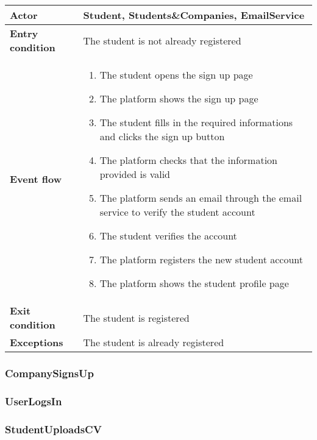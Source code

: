 \begin{table}[H]
    \centering
    \begin{tabular}{|>{\centering\arraybackslash}m{3cm}|m{10cm}|}
        \hline \textbf{Actor} & Student, Students\&Companies, EmailService \\
        \hline \textbf{Entry condition} & The student is not already registered \\
        \hline \textbf{Event flow} &
            \begin{enumerate}
                \item The student opens the sign up page
                \item The platform shows the sign up page
                \item The student fills in the required informations and clicks the sign up button
                \item The platform checks that the information provided is valid
                \item The platform sends an email through the email service to verify the student account
                \item The student verifies the account
                \item The platform registers the new student account
                \item The platform shows the student profile page
            \end{enumerate}
        \\
        \hline \textbf{Exit condition} & The student is registered \\
        \hline \textbf{Exceptions} & The student is already registered \\
        \hline
    \end{tabular}
\end{table}

\subsubsection{CompanySignsUp}

\subsubsection{UserLogsIn}

\subsubsection{StudentUploadsCV}

